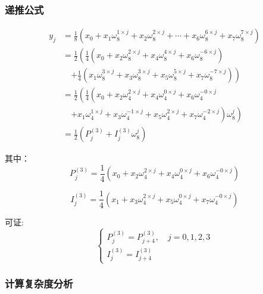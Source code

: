 \documentclass[12pt,a4paper]{article}
\numberwithin{subsection}{section}   %
\numberwithin{subsubsection}{subsection}
\theoremstyle{plain}
\theoremstyle{definition}
\theoremstyle{remark}
\theoremstyle{remark}
\begin{document}
\subsubsection{递推公式}
\begin{equation}
	\begin{aligned}
		y_j &= \frac{1}{8} \left( x_0 + x_1 \omega_8^{1 \times j} + x_2 \omega_8^{2 \times j} + \cdots + x_6 \omega_8^{6 \times j} + x_7 \omega_8^{7 \times j} \right) \\[8pt]
		&= \frac{1}{2} \left( \frac{1}{4} \left( x_0 + x_2 \omega_8^{2 \times j} + x_4 \omega_8^{4 \times j} + x_6 \omega_8^{-6 \times j} \right) \right. \\[8pt]
		&\quad \left. + \frac{1}{4} \left( x_1 \omega_8^{3 \times j} + x_3 \omega_8^{3 \times j} + x_5 \omega_8^{5 \times j} + x_7 \omega_8^{-7 \times j} \right) \right) \\[8pt]
		&= \frac{1}{2} \left( \frac{1}{4} \left( x_0 + x_2 \omega_4^{2 \times j} + x_4 \omega_4^{0 \times j} + x_6 \omega_4^{-0 \times j} \right. \right. \\[8pt]
		&\quad \left. \left. + x_1 \omega_4^{1 \times j} + x_3 \omega_4^{-1 \times j} + x_5 \omega_4^{2 \times j} + x_7 \omega_4^{-2 \times j} \right) \omega_8^{j} \right) \\[8pt]
		&= \frac{1}{2} \left( P_j^{(3)} + I_j^{(3)} \omega_8^{j} \right)
	\end{aligned}
\end{equation}

	
	其中：
	\begin{equation}
		P_j^{(3)} = \frac{1}{4} \left( x_0 + x_2 \omega_4^{2 \times j} + x_4 \omega_4^{0 \times j} + x_6 \omega_4^{-0 \times j} \right)
	\end{equation}
	
	\begin{equation}
		I_j^{(3)} = \frac{1}{4} \left( x_1 + x_3 \omega_4^{2 \times j} + x_5 \omega_4^{0 \times j} + x_7 \omega_4^{-0 \times j} \right)
	\end{equation}
	
可证:
	\begin{equation}
		\begin{cases}
			P_j^{(3)} = P_{j+4}^{(3)}, \quad j = 0, 1, 2, 3 \\[8pt]
			I_j^{(3)} = I_{j+4}^{(3)}
		\end{cases}
	\end{equation}
	
	\subsubsection{计算复杂度分析}
	
\end{document}
